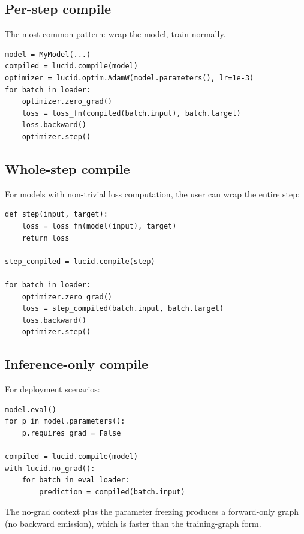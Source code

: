 \subsection{Per-step compile}
\label{ssec:compiled_module:per_step}

The most common pattern: wrap the model, train normally.

\begin{lstlisting}[style=lucid,language=LucidPython]
model = MyModel(...)
compiled = lucid.compile(model)
optimizer = lucid.optim.AdamW(model.parameters(), lr=1e-3)
for batch in loader:
    optimizer.zero_grad()
    loss = loss_fn(compiled(batch.input), batch.target)
    loss.backward()
    optimizer.step()
\end{lstlisting}

\subsection{Whole-step compile}
\label{ssec:compiled_module:whole_step}

For models with non-trivial loss computation, the user can wrap
the entire step:

\begin{lstlisting}[style=lucid,language=LucidPython]
def step(input, target):
    loss = loss_fn(model(input), target)
    return loss

step_compiled = lucid.compile(step)

for batch in loader:
    optimizer.zero_grad()
    loss = step_compiled(batch.input, batch.target)
    loss.backward()
    optimizer.step()
\end{lstlisting}

\subsection{Inference-only compile}
\label{ssec:compiled_module:inference}

For deployment scenarios:

\begin{lstlisting}[style=lucid,language=LucidPython]
model.eval()
for p in model.parameters():
    p.requires_grad = False

compiled = lucid.compile(model)
with lucid.no_grad():
    for batch in eval_loader:
        prediction = compiled(batch.input)
\end{lstlisting}

The no-grad context plus the parameter freezing produces a
forward-only graph (no backward emission), which is faster than
the training-graph form.

